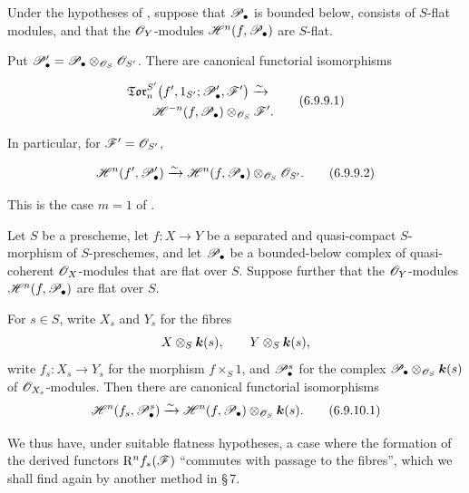 \begin{corollary}[6.9.9]
\label{III.6.9.9}
Under the hypotheses of , suppose that
$\mathscr{P}_\bullet$ is bounded below, consists of $S$-flat modules,
and that the $\mathscr{O}_Y$-modules
$\mathscr{H}^n(f,\mathscr{P}_\bullet)$ are $S$-flat.


Put $\mathscr{P}_\bullet'
=
\mathscr{P}_\bullet\otimes_{\mathscr{O}_S}\mathscr{O}_{S'}$.
There are canonical functorial isomorphisms
\begin{env}[6.9.9.1]
\label{III.6.9.9.1}
\[
\begin{split}
  &
  \mathfrak{Tor}_n^{S'}
  \bigl(
    f',1_{S'};\mathscr{P}_\bullet',\mathscr{F}'
  \bigr)
  \xrightarrow{\sim}
  \\
  &\qquad
  \mathscr{H}^{-n}(f,\mathscr{P}_\bullet)
  \otimes_{\mathscr{O}_S}\mathscr{F}'.
\end{split}
  \tag{6.9.9.1}\label{III.6.9.9.1.eq}
\]
\end{env}
In particular, for $\mathscr{F}'=\mathscr{O}_{S'}$,
\begin{env}[6.9.9.2]
\label{III.6.9.9.2}
\[
  \mathscr{H}^n(f',\mathscr{P}_\bullet')
  \xrightarrow{\sim}
  \mathscr{H}^n(f,\mathscr{P}_\bullet)
  \otimes_{\mathscr{O}_S}\mathscr{O}_{S'}.
  \tag{6.9.9.2}\label{III.6.9.9.2.eq}
\]
\end{env}
\textup{This is the case $m=1$ of .}
\end{corollary}

\begin{corollary}[6.9.10]
\label{III.6.9.10}
Let $S$ be a prescheme, let $f:X\to Y$ be a separated and
quasi-compact $S$-morphism of $S$-preschemes, and let
$\mathscr{P}_\bullet$ be a bounded-below complex of quasi-coherent
$\mathscr{O}_X$-modules that are flat over $S$.  Suppose further that
the $\mathscr{O}_Y$-modules $\mathscr{H}^n(f,\mathscr{P}_\bullet)$ are flat over
$S$.

For $s\in S$, write $X_s$ and $Y_s$ for the fibres
\[
  X\otimes_S\boldsymbol{k}(s),
  \qquad
  Y\otimes_S\boldsymbol{k}(s),
\]
write $f_s:X_s\longrightarrow Y_s$
for the morphism $f\times_S1$, and $\mathscr{P}_\bullet^s$ for the complex
$\mathscr{P}_\bullet\otimes_{\mathscr{O}_S}\boldsymbol{k}(s)$ of $\mathscr{O}_{X_s}$-modules.
Then there are canonical functorial isomorphisms
\[
  \mathscr{H}^n(f_s,\mathscr{P}_\bullet^s)
  \xrightarrow{\sim}
  \mathscr{H}^n(f,\mathscr{P}_\bullet)
  \otimes_{\mathscr{O}_S}\boldsymbol{k}(s).
  \tag{6.9.10.1}\label{III.6.9.10.1.eq}
\]
\end{corollary}

We thus have, under suitable flatness hypotheses, a case where the formation of the
derived functors $\mathrm R^nf_*(\mathscr{F})$ ``commutes with passage to the
fibres'', which we shall find again by another method in
\S\,7.

